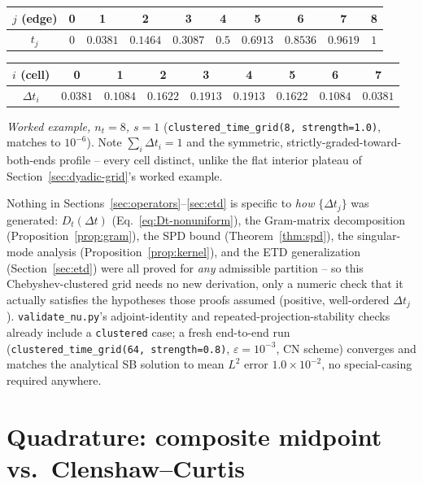 \documentclass[11pt]{article}
\newcommand{\eps}{\varepsilon}
\newcommand{\dt}{\Delta t}
\newcommand{\code}[1]{\texttt{#1}}
\begin{document}
\begin{center}
\begin{tabular}{c|ccccccccc}
\toprule
$j$ (edge) & 0 & 1 & 2 & 3 & 4 & 5 & 6 & 7 & 8 \\
\midrule
$t_j$ & $0$ & $0.0381$ & $0.1464$ & $0.3087$ & $0.5$ & $0.6913$ & $0.8536$ & $0.9619$ & $1$ \\
\bottomrule
\end{tabular}
\end{center}
\begin{center}
\begin{tabular}{c|cccccccc}
\toprule
$i$ (cell) & 0 & 1 & 2 & 3 & 4 & 5 & 6 & 7 \\
\midrule
$\dt_i$ & $0.0381$ & $0.1084$ & $0.1622$ & $0.1913$ & $0.1913$ & $0.1622$ & $0.1084$ & $0.0381$ \\
\bottomrule
\end{tabular}
\end{center}
\emph{Worked example, $n_t=8$, $s=1$} (\code{clustered\_time\_grid(8,\allowbreak\ strength=1.0)},
matches to $10^{-6}$). Note $\sum_i\dt_i=1$ and the symmetric, strictly-graded-toward-both-ends
profile -- every cell distinct, unlike the flat interior plateau of Section~\ref{sec:dyadic-grid}'s
worked example.

Nothing in Sections~\ref{sec:operators}--\ref{sec:etd} is specific to \emph{how} $\{\dt_j\}$ was
generated: $D_t(\dt)$
(Eq.~\eqref{eq:Dt-nonuniform}), the Gram-matrix decomposition (Proposition~\ref{prop:gram}), the
SPD bound (Theorem~\ref{thm:spd}), the singular-mode analysis (Proposition~\ref{prop:kernel}),
and the ETD generalization (Section~\ref{sec:etd}) were all proved for \emph{any} admissible
partition -- so this Chebyshev-clustered grid needs no new derivation, only a numeric check that
it actually satisfies the hypotheses those proofs assumed (positive, well-ordered $\dt_j$).
\code{validate\_nu.py}'s adjoint-identity and repeated-projection-stability checks already
include a \code{clustered} case; a fresh end-to-end run
(\code{clustered\_time\_grid(64,\allowbreak\ strength=0.8)}, $\eps=10^{-3}$, CN scheme) converges
and matches the analytical SB solution to mean $L^2$ error $1.0\times10^{-2}$, no special-casing
required anywhere.

\section{Quadrature: composite midpoint vs.\ Clenshaw--Curtis}
\label{sec:quadrature}
\end{document}
